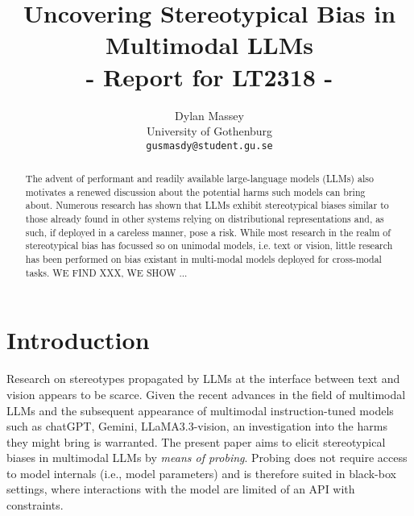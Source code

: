 \documentclass[11pt]{article}
\title{Uncovering Stereotypical Bias in Multimodal LLMs \\ - Report for LT2318 - }
\author{Dylan Massey \\
    University of Gothenburg \\
  \texttt{gusmasdy@student.gu.se}}
\begin{document}
\maketitle
\begin{abstract}


The advent of performant and readily available large-language models (LLMs) also motivates a renewed discussion about the potential harms such models can bring about. Numerous research has shown that LLMs exhibit stereotypical biases similar to those already found in other systems relying on distributional representations and, as such, if deployed in a careless manner, pose a risk. While most research in the realm of stereotypical bias has focussed so on unimodal models, i.e. text or vision, little research has been performed on bias existant in multi-modal models deployed for cross-modal tasks. WE FIND XXX, WE SHOW ...

\end{abstract}

\section{Introduction}


Research on stereotypes propagated by LLMs at the interface between text and vision appears to be scarce. Given the recent advances in the field of multimodal LLMs \citep{ruggeri_multi-dimensional_2023} and the subsequent appearance of multimodal instruction-tuned models such as chatGPT, Gemini, LLaMA3.3-vision, an investigation into the harms they might bring is warranted. The present paper aims to elicit stereotypical biases in multimodal LLMs by \textit{means of probing}. Probing does not require access to model internals (i.e., model parameters) and is therefore suited in black-box settings, where interactions with the model are limited of an API with constraints.
\end{document}
